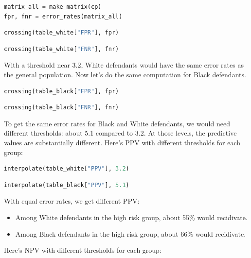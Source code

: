 \begin{lstlisting}[language=Python,style=source]
matrix_all = make_matrix(cp)
fpr, fnr = error_rates(matrix_all)
\end{lstlisting}

\begin{lstlisting}[language=Python,style=source]
crossing(table_white["FPR"], fpr)
\end{lstlisting}

\begin{lstlisting}[language=Python,style=source]
crossing(table_white["FNR"], fnr)
\end{lstlisting}

With a threshold near 3.2, White defendants would have the same error
rates as the general population. Now let's do the same computation for
Black defendants.

\begin{lstlisting}[language=Python,style=source]
crossing(table_black["FPR"], fpr)
\end{lstlisting}

\begin{lstlisting}[language=Python,style=source]
crossing(table_black["FNR"], fnr)
\end{lstlisting}

To get the same error rates for Black and White defendants, we would
need different thresholds: about 5.1 compared to 3.2. At those levels,
the predictive values are substantially different. Here's PPV with
different thresholds for each group:

\begin{lstlisting}[language=Python,style=source]
interpolate(table_white["PPV"], 3.2)
\end{lstlisting}

\begin{lstlisting}[language=Python,style=source]
interpolate(table_black["PPV"], 5.1)
\end{lstlisting}

With equal error rates, we get different PPV:

\begin{itemize}
\item
  Among White defendants in the high risk group, about 55\% would
  recidivate.
\item
  Among Black defendants in the high risk group, about 66\% would
  recidivate.
\end{itemize}

Here's NPV with different thresholds for each group:

